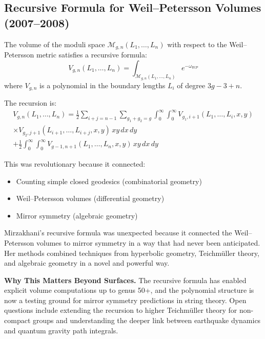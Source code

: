 \subsection{Recursive Formula for Weil--Petersson Volumes (2007--2008)}

\begin{theorem}
The volume of the moduli space $\mathcal{M}_{g,n}(L_1, \ldots, L_n)$ with respect to the Weil--Petersson metric satisfies a recursive formula:
\begin{equation}
V_{g,n}(L_1, \ldots, L_n) = \int_{\mathcal{M}_{g,n}(L_1, \ldots, L_n)} e^{-\omega_{WP}}
\end{equation}
where $V_{g,n}$ is a polynomial in the boundary lengths $L_i$ of degree $3g-3+n$.
\end{theorem}

The recursion is:
\begin{multline}
V_{g,n}(L_1, \ldots, L_n) = \frac{1}{2} \sum_{i+j = n-1} \sum_{g_1+g_2 = g} \int_0^\infty \int_0^\infty V_{g_1,i+1}(L_1, \ldots, L_i, x, y) \\
\times V_{g_2,j+1}(L_{i+1}, \ldots, L_{i+j}, x, y) \, x y \, dx \, dy \\
+ \frac{1}{2} \int_0^\infty \int_0^\infty V_{g-1,n+1}(L_1, \ldots, L_n, x, y) \, x y \, dx \, dy
\end{multline}

This was revolutionary because it connected:
\begin{itemize}
\item Counting simple closed geodesics (combinatorial geometry)
\item Weil--Petersson volumes (differential geometry)
\item Mirror symmetry (algebraic geometry)
\end{itemize}

\begin{highlightbox}
Mirzakhani's recursive formula was unexpected because it connected the Weil--Petersson volumes to mirror symmetry in a way that had never been anticipated. Her methods combined techniques from hyperbolic geometry, Teichm\"uller theory, and algebraic geometry in a novel and powerful way.
\end{highlightbox}

\textbf{Why This Matters Beyond Surfaces.} The recursive formula has enabled explicit volume computations up to genus 50+, and the polynomial structure is now a testing ground for mirror symmetry predictions in string theory. Open questions include extending the recursion to higher Teichm\"uller theory for non-compact groups and understanding the deeper link between earthquake dynamics and quantum gravity path integrals.

